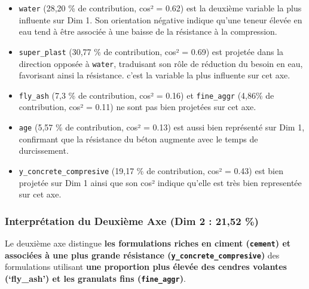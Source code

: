 \documentclass[
  12pt,
]{article}
\providecommand{\tightlist}{%
  \setlength{\itemsep}{0pt}\setlength{\parskip}{0pt}}
\begin{document}
\begin{itemize}
\tightlist
\item
  \texttt{water} (28,20 \% de contribution, cos² = 0.62) est la deuxième
  variable la plus influente sur Dim 1. Son orientation négative indique
  qu'une teneur élevée en eau tend à être associée à une baisse de la
  résistance à la compression.
\item
  \texttt{super\_plast} (30,77 \% de contribution, cos² = 0.69) est
  projetée dans la direction opposée à \texttt{water}, traduisant son
  rôle de réduction du besoin en eau, favorisant ainsi la résistance.
  c'est la variable la plus influente sur cet axe.
\item
  \texttt{fly\_ash} (7,3 \% de contribution, cos² = 0.16) et
  \texttt{fine\_aggr} (4,86\% de contribution, cos² = 0.11) ne sont pas
  bien projetées sur cet axe.
\item
  \texttt{age} (5,57 \% de contribution, cos² = 0.13) est aussi bien
  représenté sur Dim 1, confirmant que la résistance du béton augmente
  avec le temps de durcissement.
\item
  \texttt{y\_concrete\_compresive} (19,17 \% de contribution, cos² =
  0.43) est bien projetée sur Dim 1 ainsi que son cos² indique qu'elle
  est très bien representée sur cet axe.
\end{itemize}

\subsubsection{Interprétation du Deuxième Axe (Dim 2 : 21,52
\%)}\label{interpruxe9tation-du-deuxiuxe8me-axe-dim-2-2152}

Le deuxième axe distingue \textbf{les formulations riches en ciment
(\texttt{cement}) et associées à une plus grande résistance
(\texttt{y\_concrete\_compresive})} des formulations utilisant
\textbf{une proportion plus élevée des cendres volantes (`fly\_ash') et
les granulats fins (\texttt{fine\_aggr})}.
\end{document}
